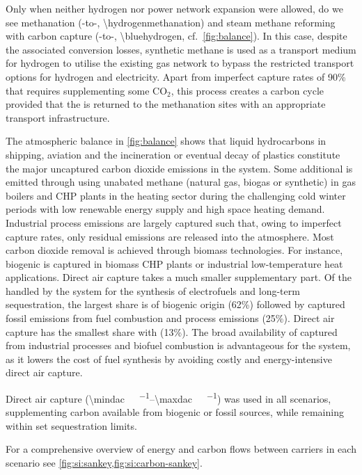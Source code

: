 Only when neither hydrogen nor power network expansion were allowed, do we see
methanation (-to-, \SI{\hydrogenmethanation}{\twh}) and steam
methane reforming with carbon capture (-to-,
\SI{\bluehydrogen}{\twh}, cf.~\cref{fig:balance}). In this case, despite the
associated conversion losses, synthetic methane is used as a transport medium
for hydrogen to utilise the existing gas network to bypass the restricted
transport options for hydrogen and electricity. Apart from imperfect capture
rates of 90\% that requires supplementing some CO$_2$, this process creates a
carbon cycle provided that the \co is returned to the methanation sites with an
appropriate \co transport infrastructure.

The atmospheric \co balance in \cref{fig:balance} shows that liquid hydrocarbons
in shipping, aviation and the incineration or eventual decay of plastics
constitute the major uncaptured carbon dioxide emissions in the system. Some
additional \co is emitted through using unabated methane (natural gas, biogas or
synthetic) in gas boilers and CHP plants in the heating sector during the
challenging cold winter periods with low renewable energy supply and high space
heating demand. Industrial process emissions are largely captured such that,
owing to imperfect capture rates, only residual emissions are released into the
atmosphere. Most carbon dioxide removal is achieved through biomass
technologies. For instance, biogenic \co is captured in biomass CHP plants or
industrial low-temperature heat applications. Direct air capture takes a much
smaller supplementary part. Of the \co handled by the system for the synthesis
of electrofuels and long-term sequestration, the largest share is of biogenic
origin (62\%) followed by captured fossil \co emissions from fuel combustion and
process emissions (25\%). Direct air capture has the smallest share with (13\%).
The broad availability of captured \co from industrial processes and biofuel
combustion is advantageous for the system, as it lowers the cost of fuel
synthesis by avoiding costly and energy-intensive direct air capture.

Direct air capture (\SIrange{\mindac}{\maxdac}{\mega\tco\per\year}) was used in
all scenarios, supplementing carbon available from biogenic or fossil sources,
while remaining within set sequestration limits.

For a comprehensive overview of energy and carbon flows between carriers in each
scenario see \cref{fig:si:sankey,fig:si:carbon-sankey}.

